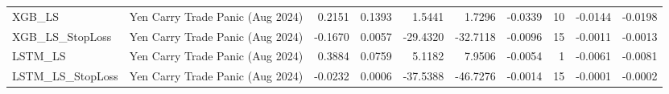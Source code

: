 \begin{tabular}{llrrrrrrrr}
\cline{1-10}
XGB\_LS & Yen Carry Trade Panic (Aug 2024) & 0.2151 & 0.1393 & 1.5441 & 1.7296 & -0.0339 & 10 & -0.0144 & -0.0198 \\
\cline{1-10}
XGB\_LS\_StopLoss & Yen Carry Trade Panic (Aug 2024) & -0.1670 & 0.0057 & -29.4320 & -32.7118 & -0.0096 & 15 & -0.0011 & -0.0013 \\
\cline{1-10}
LSTM\_LS & Yen Carry Trade Panic (Aug 2024) & 0.3884 & 0.0759 & 5.1182 & 7.9506 & -0.0054 & 1 & -0.0061 & -0.0081 \\
\cline{1-10}
LSTM\_LS\_StopLoss & Yen Carry Trade Panic (Aug 2024) & -0.0232 & 0.0006 & -37.5388 & -46.7276 & -0.0014 & 15 & -0.0001 & -0.0002 \\
\cline{1-10}
\bottomrule
\end{tabular}
